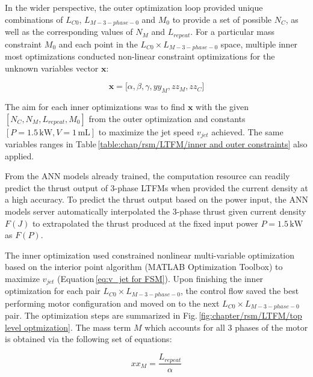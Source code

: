     
                In the wider perspective, the outer optimization loop provided unique combinations of $L_{C0}$, $L_{M-3-phase-0}$ and $M_0$ to provide a set of possible $N_C$, as well as the corresponding values of $N_M$ and $L_{repeat}$. For a particular mass constraint $M_0$ and each point in the $L_{C0}\times L_{M-3-phase-0}$ space, multiple inner most optimizations conducted non-linear constraint optimizations for the unknown variables vector $\textbf{x}$:
                
                
                \begin{equation}
                    \textbf{x} = \big[ \alpha,\beta,\gamma, yy_M, zz_M, zz_C \big]
                    \label{eq:chap/rsm/LTFM/optimization output}
                \end{equation}
                
                
                The aim for each inner optimizations was to find $\textbf{x}$ with the given $[N_C,N_M,L_{repeat},M_0]$ from the outer optimization and constants $[P=1.5\,\mathrm{kW},V=1\,\mathrm{mL}]$ to maximize the jet speed $v_{jet}$ achieved. The same variables ranges in Table\,\ref{table:chap/rsm/LTFM/inner and outer constraints} also applied. 
                
                
                From the \acs{ANN} models already trained, the computation resource can readily predict the thrust output of 3-phase \acsp{LTFM} when provided the current density at a high accuracy. To predict the thrust output based on the power input, the \acs{ANN} models server automatically interpolated the 3-phase thrust given current density $F(J)$ to extrapolated the thrust produced at the fixed input power $P=1.5\,\mathrm{kW}$ as $F(P)$.
                
                
                The inner optimization used constrained nonlinear multi-variable optimization based on the interior point algorithm (MATLAB Optimization Toolbox) to maximize $v_{jet}$ (Equation\,\ref{eq:v_jet for FSM}). Upon finishing the inner optimization for each pair $L_{C0}\times L_{M-3-phase-0}$, the control flow saved the best performing motor configuration and moved on to the next $L_{C0}\times L_{M-3-phase-0}$ pair. The optimization steps are summarized in Fig.\,\ref{fig:chapter/rsm/LTFM/top level optmization}. The mass term $M$ which accounts for all 3 phases of the motor is obtained via the following set of equations:
                
                
                    \begin{equation}
                        xx_M = \frac{L_{repeat}}{\alpha}
                        \label{eq:chap/rsm/LTFM/mass/xx_m}
                    \end{equation}
                    

